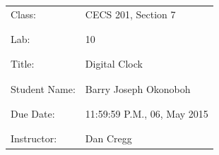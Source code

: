 \documentclass[9pt]{article}
\begin{document}
\vspace*{\fill}
\begin{center}
{\Huge \begin{tabular}{@{}ll@{}}
   Class: & CECS 201, Section 7 \\ \\ \\
   Lab: & 10 \\ \\ \\
   Title: & Digital Clock \\ \\ \\
   Student Name: & Barry Joseph Okonoboh \\ \\ \\
   Due Date: & 11:59:59 P.M., 06, May 2015 \\ \\ \\
   Instructor: & Dan Cregg
\end{tabular}}
\end{center}
\vspace*{\fill}
\newpage
\end{document}
